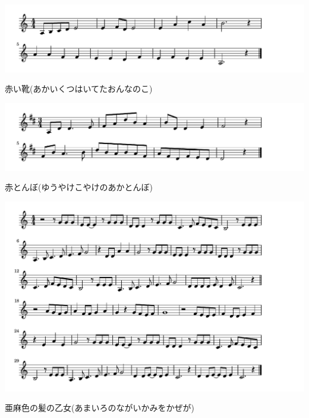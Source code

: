 \documentclass[a4paper]{ltjsarticle}
\begin{document}
\includegraphics[clip]{akaikutsu_crop.pdf}

\vspace{-10mm} \hspace{10mm}
赤い靴(あかいくつはいてたおんなのこ)



\includegraphics[clip]{akatonbo_crop.pdf}



\vspace{-10mm} \hspace{10mm}
赤とんぼ(ゆうやけこやけのあかとんぼ)




\includegraphics[clip]{amaironokami_crop.pdf}



\vspace{--10mm} \hspace{10mm}
亜麻色の髪の乙女(あまいろのながいかみをかぜが)
\end{document}
